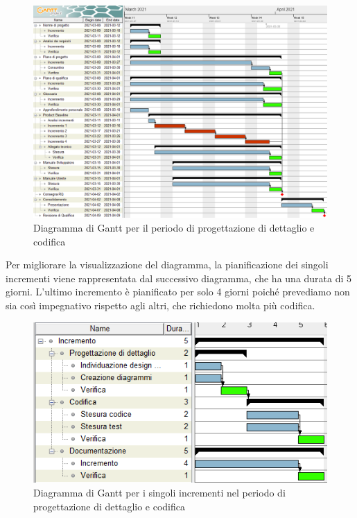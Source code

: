\begin{figure}[H]
\centering

\centerline{\includegraphics[scale=0.6]{res/Pianificazione/Gantt/codifica}}
\caption{Diagramma di Gantt per il periodo di progettazione di dettaglio e codifica}
\end{figure}

Per migliorare la visualizzazione del diagramma, la pianificazione dei singoli incrementi viene rappresentata dal successivo diagramma, che ha una durata di 5 giorni. L'ultimo incremento è pianificato per solo 4 giorni poiché prevediamo non sia così impegnativo rispetto agli altri, che richiedono molta più codifica.\\

\begin{figure}[H]
\centering

\centerline{\includegraphics[scale=1]{res/Pianificazione/Gantt/incCodifica.PNG}}
\caption{Diagramma di Gantt per i singoli incrementi nel periodo di progettazione di dettaglio e codifica}
\end{figure}
